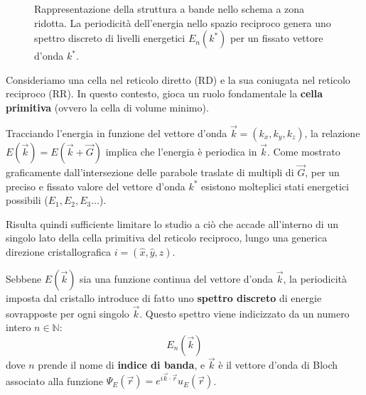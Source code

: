 \begin{figure}[htbp]
    \caption{Rappresentazione della struttura a bande nello schema a zona ridotta. La periodicità dell'energia nello spazio reciproco genera uno spettro discreto di livelli energetici \(E_n(k^*)\) per un fissato vettore d'onda \(k^*\).}
    \label{fig:bande_zona_ridotta}
\end{figure}

Consideriamo una cella nel reticolo diretto (RD) e la sua coniugata nel reticolo reciproco (RR). In questo contesto, gioca un ruolo fondamentale la \textbf{cella primitiva} (ovvero la cella di volume minimo).

Tracciando l'energia in funzione del vettore d'onda \(\vec{k} = (k_x, k_y, k_z)\), la relazione \(E(\vec{k}) = E(\vec{k} + \vec{G})\) implica che l'energia è periodica in \(\vec{k}\). Come mostrato graficamente dall'intersezione delle parabole traslate di multipli di \(\vec{G}\), per un preciso e fissato valore del vettore d'onda \(k^*\) esistono molteplici stati energetici possibili (\(E_1, E_2, E_3 \dots\)).

Risulta quindi sufficiente limitare lo studio a ciò che accade all'interno di un singolo lato della cella primitiva del reticolo reciproco, lungo una generica direzione cristallografica \(i = (\hat{x}, \hat{y}, \hat{z})\).

Sebbene \(E(\vec{k})\) sia una funzione continua del vettore d'onda \(\vec{k}\), la periodicità imposta dal cristallo introduce di fatto uno \textbf{spettro discreto} di energie sovrapposte per ogni singolo \(\vec{k}\). Questo spettro viene indicizzato da un numero intero \(n \in \mathbb{N}\):
\begin{equation}
    E_n(\vec{k})
\end{equation}
dove \(n\) prende il nome di \textbf{indice di banda}, e \(\vec{k}\) è il vettore d'onda di Bloch associato alla funzione \(\Psi_E(\vec{r}) = e^{i\vec{k}\cdot\vec{r}} u_E(\vec{r})\).

